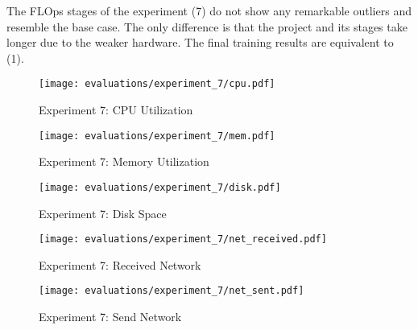 The FLOps stages of the experiment (7) do not show any remarkable outliers and resemble the base case.
The only difference is that the project and its stages take longer due to the weaker hardware.
The final training results are equivalent to (1).



\begin{figure}[p]

    \begin{adjustwidth}{-0.2\paperwidth}{-0.2\paperwidth}
        \centering
        \texttt{[image: evaluations/experiment\_7/cpu.pdf]}
        \caption{Experiment 7: CPU Utilization}
        \label{fig:eval_7_cpu}
    \end{adjustwidth}

    \begin{adjustwidth}{-0.2\paperwidth}{-0.2\paperwidth}
        \centering
        \texttt{[image: evaluations/experiment\_7/mem.pdf]}
        \caption{Experiment 7: Memory Utilization}
        \label{fig:eval_7_mem}
    \end{adjustwidth}

    \begin{adjustwidth}{-0.2\paperwidth}{-0.2\paperwidth}
        \centering
        \texttt{[image: evaluations/experiment\_7/disk.pdf]}
        \caption{Experiment 7: Disk Space}
        \label{fig:eval_7_disk_space}
    \end{adjustwidth}
\end{figure}

\begin{figure}[p]
    \begin{adjustwidth}{-0.2\paperwidth}{-0.2\paperwidth}
        \centering
        \texttt{[image: evaluations/experiment\_7/net\_received.pdf]}
        \caption{Experiment 7: Received Network}
        \label{fig:eval_7_net_received}
    \end{adjustwidth}

    \begin{adjustwidth}{-0.2\paperwidth}{-0.2\paperwidth}
        \centering
        \texttt{[image: evaluations/experiment\_7/net\_sent.pdf]}
        \caption{Experiment 7: Send Network}
        \label{fig:eval_7_net_send}
    \end{adjustwidth}
\end{figure}

